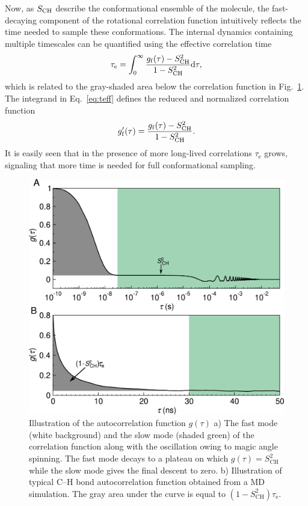 \documentclass[journal=jcisd8,manuscript=article,layout=twocolumn]{achemso}
\begin{document}
Now, as $S_{\rm{CH}}$ describe the conformational ensemble of the molecule, the fast-decaying component of the rotational correlation function intuitively reflects the time needed to sample these conformations.
The internal dynamics containing multiple timescales can be quantified using the effective correlation time
\begin{equation}
\label{eq:teff}
\tau_\mathrm{e}=\int_{0}^{\infty}\frac{g_{\mathrm{f}}(\tau)-S^{2}_{\rm{CH}}}{1-S^2_{\mathrm{CH}}}\mathrm d\tau,
\end{equation}
which is related to the gray-shaded area below the correlation function in Fig.~\ref{fig:schem_teff}.
The integrand in Eq.~\eqref{eq:teff} defines the reduced and normalized correlation function
\begin{equation}
\label{eq:nBCF}
g'_{\mathrm{f}}(\tau)=\frac{g_{\mathrm{f}}(\tau)-S^{2}_{\rm{CH}}}{1-S^2_{\mathrm{CH}}}.
\end{equation}
It is easily seen that in the presence of more long-lived correlations $\tau_\mathrm{e}$ grows, signaling that more time is needed for full conformational sampling.

\begin{figure}[t]
\includegraphics[scale=0.45]{./figures/gfun_draft.pdf} 
\caption{Illustration of the autocorrelation function $g(\tau)$ a) The fast mode (white background) and the slow mode (shaded green) of the correlation function along with the oscillation owing to magic angle spinning. The fast mode decays to a plateau on which $g(\tau)=S^2_{\mathrm{CH}}$ while the slow mode gives the final descent to zero. b) Illustration of typical C--H bond autocorrelation function obtained from a MD simulation. The gray area under the curve is equal to $(1-S^2_{\mathrm{CH}})\tau_\mathrm{e}$. }
\label{fig:schem_teff}
\end{figure} 
\end{document}
